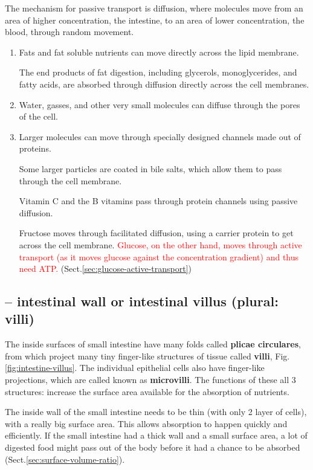 The mechanism for passive transport is diffusion, where molecules move from an
area of higher concentration, the intestine, to an area of lower concentration,
the blood, through random movement.
\begin{enumerate} 
  \item Fats and fat soluble nutrients can move directly across the lipid
  membrane.
  
The end products of fat digestion, including glycerols, monoglycerides, and
fatty acids, are absorbed through diffusion directly across the cell membranes.


  \item Water, gasses, and other very small molecules can diffuse through the
  pores of the cell.  
  
  \item Larger molecules can move through specially designed channels made out
  of proteins.

Some larger particles are coated in bile salts, which allow them to pass through
the cell membrane.

Vitamin C and the B vitamins pass through protein channels using passive
diffusion. 

Fructose moves through facilitated diffusion, using a carrier protein to get
across the cell membrane. \textcolor{red}{Glucose, on the other hand, moves
through active transport (as it moves glucose against the concentration
gradient) and thus need ATP.} (Sect.\ref{sec:glucose-active-transport})
\end{enumerate}

  
\subsection{-- intestinal wall or intestinal villus (plural: villi)}
\label{sec:villi}
\label{sec:intestinal-wall}

The inside surfaces of small intestine have many folds called {\bf plicae
circulares}, from which project many tiny finger-like structures of tissue
called {\bf villi}, Fig.\ref{fig:intestine-villus}. The individual epithelial
cells also have finger-like projections, which are called known as {\bf
microvilli}. The functions of these all 3 structures: increase the surface area
available for the absorption of nutrients.

The inside wall of the small intestine needs to be thin (with only 2 layer of
cells), with a really big surface area. This allows absorption to happen quickly
and efficiently. If the small intestine had a thick wall and a small surface
area, a lot of digested food might pass out of the body before it had a chance
to be absorbed (Sect.\ref{sec:surface-volume-ratio}).

